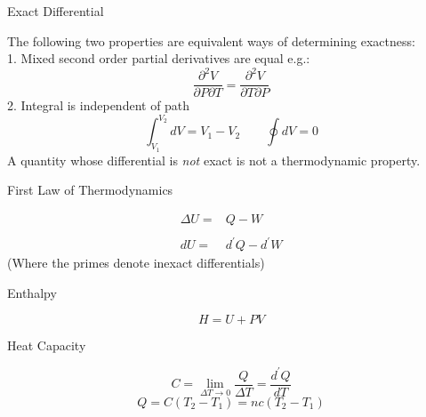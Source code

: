 \documentclass[avery5371,grid]{flashcards}
\newcommand{\dQ}[0]{d^{\prime}\!Q}
\newcommand{\dW}[0]{d^{\prime}\!W}
\begin{document}
\begin{flashcard}[Definition]{Exact Differential}
  \begin{tiny}
  The following two properties are equivalent ways of determining exactness:\\
  1. Mixed second order partial derivatives are equal e.g.:
  \begin{displaymath}
    \frac{\partial^2 V}{\partial P \partial T} = 
    \frac{\partial^2 V}{\partial T \partial P}
  \end{displaymath}
  2. Integral is independent of path
  \begin{displaymath}
    \int_{V_1}^{V_2} dV = V_1 - V_2 \qquad \oint dV = 0
  \end{displaymath}
  A quantity whose differential is \emph{not} exact is not a thermodynamic property.
  \end{tiny}
\end{flashcard}

\begin{flashcard}[Law]{First Law of Thermodynamics}
  \begin{center}
    \begin{displaymath}
      \begin{array}{ll}
	\Delta U = & Q - W\\
	 & \\
	dU = &\dQ - \dW
      \end{array}
    \end{displaymath}
    \medskip
    (Where the primes denote inexact differentials)
  \end{center}
\end{flashcard}

\begin{flashcard}[Definition]{Enthalpy}
  \begin{center}
    \begin{displaymath}
      H = U + PV
    \end{displaymath}
  \end{center}
\end{flashcard}

\begin{flashcard}[Definition]{Heat Capacity}
  \begin{center}
    \begin{displaymath}
      C = \lim_{\Delta T\to0} \frac{Q}{\Delta T} = \frac{\dQ}{dT}
    \end{displaymath}
    \begin{displaymath}
      Q = C(T_2 - T_1) = nc(T_2 - T_1)
    \end{displaymath}
  \end{center}
\end{flashcard}
\end{document}

